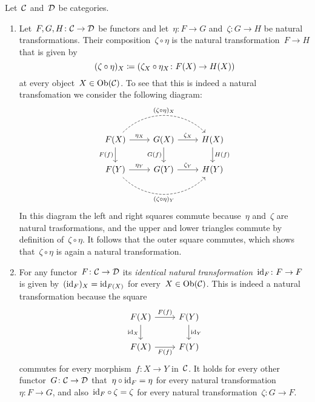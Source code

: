 \begin{remark}
  Let~$\mathcal{C}$ and~$\mathcal{D}$ be categories.
  \begin{enumerate}
    \item
      Let~$F, G, H \colon \mathcal{C} \to \mathcal{D}$ be functors and let~$\eta \colon F \to G$ and~$\zeta \colon G \to H$ be natural transformations.
      Their composition~$\zeta \circ \eta$ is the natural transformation~$F \to H$ that is given by
      \[
        (\zeta \circ \eta)_X
        \coloneqq
        ( \zeta_X \circ \eta_X \colon F(X) \to H(X) )
      \]
      at every object~$X \in \operatorname{Ob}(\mathcal{C})$.
      To see that this is indeed a natural transfomation we consider the following diagram:
      \[
        \begin{tikzcd}
            F(X)
            \arrow[dashed, bend left = 45]{rr}[above]{(\zeta \circ \eta)_X}
            \arrow{r}[above]{\eta_X}
            \arrow{d}[left]{F(f)}
          & G(X)
            \arrow{r}[above]{\zeta_X}
            \arrow{d}[left]{G(f)}
          & H(X)
            \arrow{d}[right]{H(f)}
          \\
            F(Y)
            \arrow{r}[above]{\eta_Y}
            \arrow[dashed, bend right = 45]{rr}[below]{(\zeta \circ \eta)_Y}
          & G(Y)
            \arrow{r}[above]{\zeta_Y}
          & H(Y)
        \end{tikzcd}
      \]
      In this diagram the left and right squares commute because~$\eta$ and~$\zeta$ are natural trasformations, and the upper and lower triangles commute by definition of~$\zeta \circ \eta$.
      It follows that the outer square commutes, which shows that~$\zeta \circ \eta$ is again a natural transformation.
    \item
      For any functor~$F \colon \mathcal{C} \to \mathcal{D}$ its \emph{identical natural transformation}~$\operatorname{id}_F \colon F \to F$ is given by~$(\operatorname{id}_F)_X = \operatorname{id}_{F(X)}$ for every~$X \in \operatorname{Ob}(\mathcal{C})$.
      This is indeed a natural transformation because the square
      \[
        \begin{tikzcd}
            F(X)
            \arrow{r}[above]{F(f)}
            \arrow{d}[left]{\id_X}
          & F(Y)
            \arrow{d}[right]{\id_Y}
          \\
            F(X)
            \arrow{r}[below]{F(f)}
          & F(Y)
        \end{tikzcd}
      \]
      commutes for every morphism~$f \colon X \to Y$ in~$\mathcal{C}$.
      It holds for every other functor~$G \colon \mathcal{C} \to \mathcal{D}$ that~$\eta \circ {\operatorname{id}_F} = \eta$ for every natural transformation~$\eta \colon F \to G$, and also~${\operatorname{id}_F} \circ \zeta = \zeta$ for every natural transformation~$\zeta \colon G \to F$.
  \end{enumerate}
\end{remark}


